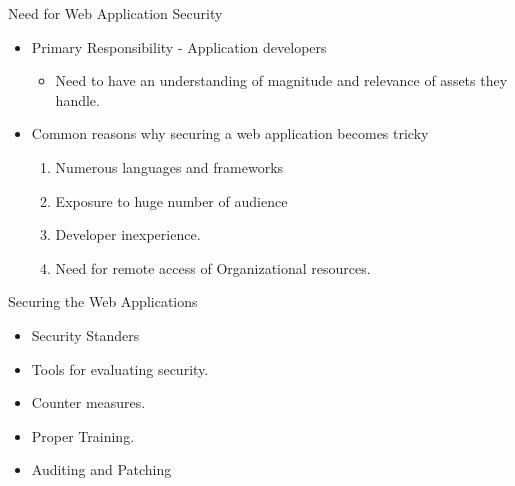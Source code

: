\documentclass[xcolor=x11names,compress]{beamer}
\renewcommand{\(}{\begin{columns}}
\renewcommand{\)}{\end{columns}}
\newcommand{\<}[1]{\begin{column}{#1}}
\renewcommand{\>}{\end{column}}
\begin{document}
\begin{frame}{Need for Web Application Security}
	\begin{itemize}
		\item Primary Responsibility - Application developers 
		\begin{itemize}
			\item Need to have an understanding of magnitude and relevance of assets they handle.
			\newline
		\end{itemize}
		\item Common reasons why securing a
		web application becomes tricky
		\begin{enumerate}
			\item Numerous languages and frameworks
			\item Exposure to huge number of audience
			\item Developer inexperience.
			\item Need for remote access of Organizational resources. 
		\end{enumerate}
	\end{itemize}
\end{frame}

\begin{frame}{Securing the Web Applications}
	\begin{itemize}
		\item Security Standers
		\newline
		\item Tools for evaluating security.
		\newline
		\item Counter measures.
		\newline
		\item Proper Training.
		\newline
		\item Auditing and Patching 
	\end{itemize}
\end{frame}

\end{document}
